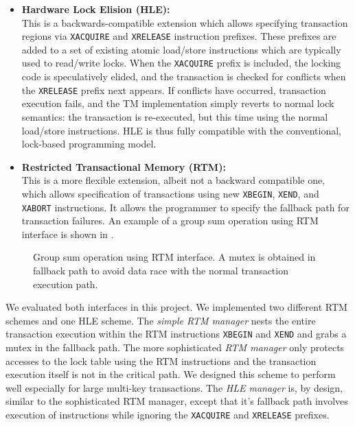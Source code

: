 \begin{itemize} 
\item \textbf{Hardware Lock Elision (HLE):} \\ This is a backwards-compatible
  extension which allows specifying transaction regions via \texttt{XACQUIRE}
  and \texttt{XRELEASE} instruction prefixes. These prefixes are added to a set
  of existing atomic load/store instructions which are typically used to
  read/write locks. When the \texttt{XACQUIRE} prefix is included, the locking
  code is speculatively elided, and the transaction is checked for conflicts
  when the \texttt{XRELEASE} prefix next appears. If conflicts have occurred,
  transaction execution fails, and the TM implementation simply reverts to
  normal lock semantics: the transaction is re-executed, but this time using the
  normal load/store instructions. HLE is thus fully compatible with the
  conventional, lock-based programming model. \\
\item \textbf{Restricted Transactional Memory (RTM):} \\ This is a more flexible
  extension, albeit not a backward compatible one, which allows specification of
  transactions using new \texttt{XBEGIN}, \texttt{XEND}, and \texttt{XABORT}
  instructions. It allows the programmer to specify the fallback path for
  transaction failures. An example of a group sum operation using RTM interface
  is shown in .\\
\end{itemize}

 \begin{figure}
    \parbox[t]{0.45\textwidth}{} \caption{Group
        sum operation using RTM interface. A mutex is obtained in fallback path
to avoid data race with the normal transaction execution path.} \label{fig:rtm}
\end{figure}

We evaluated both interfaces in this project. We implemented two different 
RTM schemes and one HLE scheme.
The \textit{simple RTM manager} nests the entire transaction execution within the RTM
instructions \texttt{XBEGIN} and \texttt{XEND} and grabs a mutex in the fallback path.
The more sophisticated \textit{RTM manager} only protects accesses to the lock table 
using the RTM instructions \citep{tsx-guide} and the transaction execution itself is not in the critical 
path. We designed this scheme to perform well especially for large multi-key 
transactions.  
The \textit{HLE manager} is, by design, similar to the sophisticated RTM manager, except 
that it's fallback path involves execution of instructions while ignoring 
the \texttt{XACQUIRE} and \texttt{XRELEASE} prefixes.

